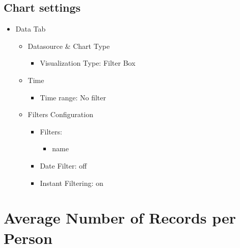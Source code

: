 \documentclass[
]{book}
\providecommand{\tightlist}{%
  \setlength{\itemsep}{0pt}\setlength{\parskip}{0pt}}
\begin{document}
\hypertarget{chart-settings-27}{%
\subsection{Chart settings}\label{chart-settings-27}}

\begin{itemize}
\tightlist
\item
  Data Tab

  \begin{itemize}
  \tightlist
  \item
    Datasource \& Chart Type

    \begin{itemize}
    \tightlist
    \item
      Visualization Type: Filter Box
    \end{itemize}
  \item
    Time

    \begin{itemize}
    \tightlist
    \item
      Time range: No filter
    \end{itemize}
  \item
    Filters Configuration

    \begin{itemize}
    \tightlist
    \item
      Filters:

      \begin{itemize}
      \tightlist
      \item
        name
      \end{itemize}
    \item
      Date Filter: off
    \item
      Instant Filtering: on
    \end{itemize}
  \end{itemize}
\end{itemize}

\hypertarget{average-number-of-records-per-person}{%
\section{Average Number of Records per Person}\label{average-number-of-records-per-person}}
\end{document}
